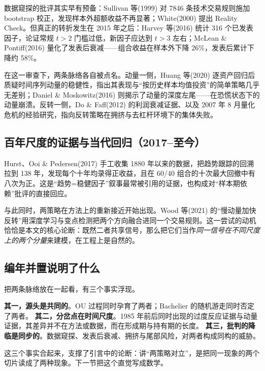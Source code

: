 数据窥探的批评其实早有预备：Sullivan 等(1999) 对 7846 条技术交易规则施加 bootstrap 校正，发现样本外超额收益不再显著\cite{sullivan1999}；White(2000) 提出 Reality Check\cite{white2000}。但真正的转折发生在 2015 年之后：Harvey 等(2016) 统计 316 个已发表因子，论证常规 $t>2$ 门槛过低，新因子应达到 $t>3$ 左右\cite{hlz2016}；McLean \& Pontiff(2016) 量化了发表后衰减——组合收益在样本外下降 26\%，发表后累计下降约 58\%\cite{mcleanpontiff2016}。

在这一审查下，两条脉络各自被点名。动量一侧，Huang 等(2020) 逐资产回归后质疑时间序列动量的稳健性，指出其表现与“按历史样本均值投资”的简单策略几乎无差别\cite{huang2020}；Daniel \& Moskowitz(2016) 则揭示了动量的深度左尾——在恐慌状态下的动量崩溃\cite{danielmoskowitz2016}。反转一侧，Do \& Faff(2012) 的利润衰减证据\cite{dofaff2012}、以及 2007 年 8 月量化危机的经验研究\cite{khandanilo2011}，指向反转策略在拥挤与去杠杆环境下的集体失败。

\subsection{百年尺度的证据与当代回归（2017--至今）}

Hurst、Ooi \& Pedersen(2017) 手工收集 1880 年以来的数据，把趋势跟踪的回溯拉到 138 年，发现每个十年均录得正收益，且在 60/40 组合的十次最大回撤中有八次为正\cite{hop2017}。这是“趋势=稳健因子”叙事最常被引用的证据，也构成对“样本期依赖”批评的直接回应。

与此同时，两策略在方法上的重新接近开始出现。Wood 等(2021) 的“慢动量加快反转”用深度学习与变点检测把两个方向融合进同一个交易规则\cite{wood2021}。这一尝试的动机恰恰是本文的核心论断：既然二者共享信号，那么把它们当作\emph{同一信号在不同尺度上的两个分量}来建模，在工程上是自然的。

\subsection{编年并置说明了什么}

把两条脉络放在一起看，有三个事实浮现。

\textbf{其一，源头是共同的}。OU 过程同时孕育了两者；Bachelier 的随机游走同时否定了两者。
\textbf{其二，分岔点在时间尺度}。1985 年前后同时出现的过度反应证据与动量证据，其差异并不在方法或数据，而在形成期与持有期的长度。
\textbf{其三，批判的降临是同步的}。数据窥探、发表后衰减、拥挤与尾部风险，对两者构成同构的威胁。

这三个事实合起来，支撑了引言中的论断：讲“两策略对立”，是把同一现象的两个切片读成了两种现象。下一节把这个直觉写成数学。

